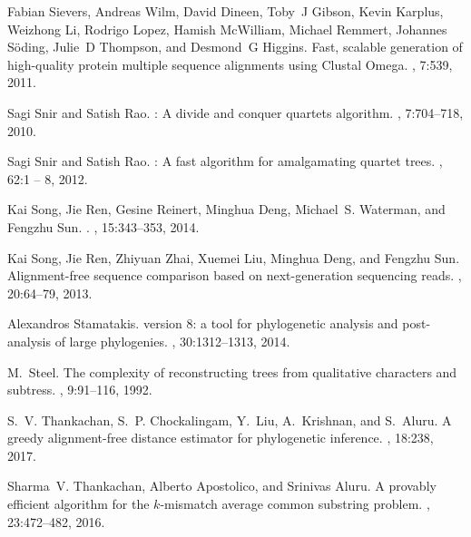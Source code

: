 \documentclass[review]{elsarticle}
\begin{document}
{\begin{thebibliography}{10}
Fabian Sievers, Andreas Wilm, David Dineen, Toby~J Gibson, Kevin Karplus,
  Weizhong Li, Rodrigo Lopez, Hamish McWilliam, Michael Remmert, Johannes
  S{\"o}ding, Julie~D Thompson, and Desmond~G Higgins.
\newblock Fast, scalable generation of high-quality protein multiple sequence
  alignments using {Clustal Omega}.
, 7:539, 2011.

Sagi Snir and Satish Rao.
: A divide and conquer quartets algorithm.
, 7:704--718, 2010.

Sagi Snir and Satish Rao.
: A fast algorithm for amalgamating quartet trees.
, 62:1 -- 8, 2012.

Kai Song, Jie Ren, Gesine Reinert, Minghua Deng, Michael~S. Waterman, and
  Fengzhu Sun.
.
, 15:343--353, 2014.

Kai Song, Jie Ren, Zhiyuan Zhai, Xuemei Liu, Minghua Deng, and Fengzhu Sun.
\newblock Alignment-free sequence comparison based on next-generation
  sequencing reads.
, 20:64--79, 2013.

Alexandros Stamatakis.
 version 8: a tool for phylogenetic analysis and post-analysis
  of large phylogenies.
, 30:1312--1313, 2014.

M.~Steel.
\newblock The complexity of reconstructing trees from qualitative characters
  and subtress.
, 9:91--116, 1992.

S.~V. Thankachan, S.~P. Chockalingam, Y.~Liu, A.~Krishnan, and S.~Aluru.
\newblock A greedy alignment-free distance estimator for phylogenetic
  inference.
, 18:238, 2017.

Sharma~V. Thankachan, Alberto Apostolico, and Srinivas Aluru.
\newblock A provably efficient algorithm for the $k$-mismatch average common
  substring problem.
, 23:472--482, 2016.


\end{thebibliography}}
\end{document}
